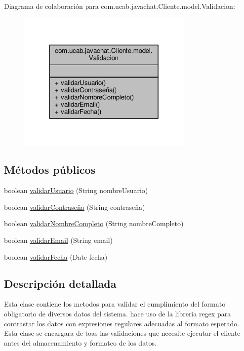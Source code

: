 Diagrama de colaboración para com.\-ucab.\-javachat.\-Cliente.\-model.\-Validacion\-:\nopagebreak
\begin{figure}[H]
\begin{center}
\leavevmode
\includegraphics[width=244pt]{classcom_1_1ucab_1_1javachat_1_1_cliente_1_1model_1_1_validacion__coll__graph}
\end{center}
\end{figure}
\subsection*{Métodos públicos}
\begin{DoxyCompactItemize}
\item 
boolean \hyperlink{classcom_1_1ucab_1_1javachat_1_1_cliente_1_1model_1_1_validacion_a4d7e1104a20469f92144e9580b34f901}{validar\-Usuario} (String nombre\-Usuario)
\item 
boolean \hyperlink{classcom_1_1ucab_1_1javachat_1_1_cliente_1_1model_1_1_validacion_a03b6327d88c6fb0e69ef43ed72918e46}{validar\-Contraseña} (String contraseña)
\item 
boolean \hyperlink{classcom_1_1ucab_1_1javachat_1_1_cliente_1_1model_1_1_validacion_a1efa66eae747068c6492c79f9442be1a}{validar\-Nombre\-Completo} (String nombre\-Completo)
\item 
boolean \hyperlink{classcom_1_1ucab_1_1javachat_1_1_cliente_1_1model_1_1_validacion_ad8d244737f6462e48ab8d02a307a36f2}{validar\-Email} (String email)
\item 
boolean \hyperlink{classcom_1_1ucab_1_1javachat_1_1_cliente_1_1model_1_1_validacion_a3367f0c6cc3c94de17840e359ffd2433}{validar\-Fecha} (Date fecha)
\end{DoxyCompactItemize}


\subsection{Descripción detallada}
Esta clase contiene los metodos para validar el cumplimiento del formato obligatorio de diversos datos del sistema. hace uso de la libreria regex para contrastar los datos con expresiones regulares adecuadas al formato esperado. Esta clase se encargara de toas las validaciones que necesite ejecutar el cliente antes del almacenamiento y formateo de los datos.

